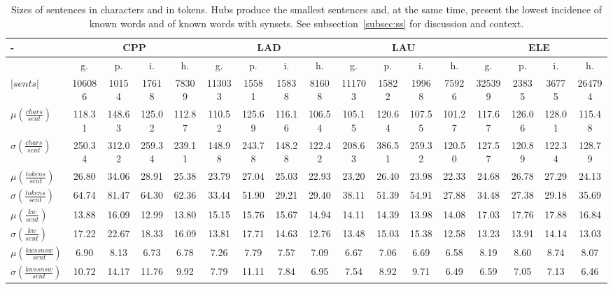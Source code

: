 \documentclass[%
 aip,
 jmp,%
 amsmath,amssymb,
 reprint,%
 floatfix,
]{revtex4-1}
\begin{document}
\begin{table}
  \centering
    \footnotesize
\setlength{\tabcolsep}{.16667em}
  \begin{tabular}{|l|| c|c|c|c||  c|c|c|c||   c|c|c|c||   c|c|c|c|}\hline
-\-  & \multicolumn{4}{c|}{CPP} & \multicolumn{4}{c|}{LAD} & \multicolumn{4}{c|}{LAU} & \multicolumn{4}{c|}{ELE} \\ \hline
 & g. & p. & i. & h. &     g. & p. & i. & h. &    g. & p. & i. & h. &    g. & p. & i. & h. \\\hline
$|sents|$ & 106086 & 10154 & 17618 & 78309 & 113033 & 15581 & 15838 & 81608 & 111703 & 15822 & 19968 & 75926 & 325399 & 23835 & 36775 & 264794 \\ \hline
$\mu\left(\frac{chars}{sent}\right)$ & 118.31 & 148.63 & 125.02 & 112.87 & 110.52 & 125.69 & 116.16 & 106.54 & 105.15 & 120.64 & 107.55 & 101.27 & 117.67 & 126.06 & 128.01 & 115.48 \\
$\sigma\left(\frac{chars}{sent}\right)$ & 250.34 & 312.02 & 259.34 & 239.11 & 148.98 & 243.78 & 148.28 & 122.42 & 208.63 & 386.51 & 259.32 & 120.50 & 127.57 & 120.89 & 122.34 & 128.79 \\ \hline
$\mu\left(\frac{tokens}{sent}\right)$ & 26.80 & 34.06 & 28.91 & 25.38 & 23.79 & 27.04 & 25.03 & 22.93 & 23.20 & 26.40 & 23.98 & 22.33 & 24.68 & 26.78 & 27.29 & 24.13 \\
$\sigma\left(\frac{tokens}{sent}\right)$ & 64.74 & 81.47 & 64.30 & 62.36 & 33.44 & 51.90 & 29.21 & 29.40 & 38.11 & 51.39 & 54.91 & 27.88 & 34.48 & 27.38 & 29.18 & 35.69 \\ \hline
$\mu\left(\frac{kw}{sent}\right)$ & 13.88 & 16.09 & 12.99 & 13.80 & 15.15 & 15.76 & 15.67 & 14.94 & 14.11 & 14.39 & 13.98 & 14.08 & 17.03 & 17.76 & 17.88 & 16.84 \\
$\sigma\left(\frac{kw}{sent}\right)$ & 17.22 & 22.67 & 18.33 & 16.09 & 13.81 & 17.71 & 14.63 & 12.76 & 13.48 & 15.03 & 15.38 & 12.58 & 13.23 & 13.91 & 14.14 & 13.03 \\ \hline
$\mu\left(\frac{kwssnsw}{sent}\right)$ & 6.90 & 8.13 & 6.73 & 6.78 & 7.26 & 7.79 & 7.57 & 7.09 & 6.67 & 7.06 & 6.69 & 6.58 & 8.19 & 8.60 & 8.74 & 8.07 \\
$\sigma\left(\frac{kwssnsw}{sent}\right)$ & 10.72 & 14.17 & 11.76 & 9.92 & 7.79 & 11.11 & 7.84 & 6.95 & 7.54 & 8.92 & 9.71 & 6.49 & 6.59 & 7.05 & 7.13 & 6.46 \\ \hline
  \end{tabular}
  \caption{Sizes of sentences in characters and in tokens. Hubs produce the smallest sentences and, at the same time, present the lowest incidence of known words and of known words with synsets. See subsection~\ref{subsec:ss} for discussion and context.}
  \label{tab:sizesSents}
\end{table}
\end{document}
